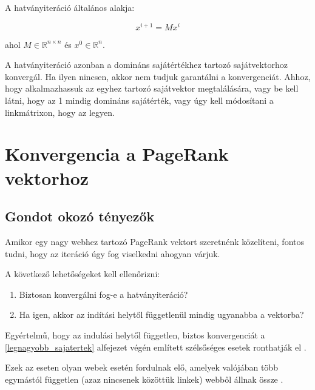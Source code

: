 \documentclass[12pt,a4paper]{article}
\begin{document}
\vspace{0.2cm}
A hatványiteráció általános alakja:

\[ x^{i+1} = M x^i \]

ahol $M \in \mathbb{R}^{n \times n}$ és $x^0 \in \mathbb{R}^n$.
\vspace{0.2cm}

A hatványiteráció azonban a domináns sajátértékhez tartozó sajátvektorhoz konvergál. Ha ilyen nincsen, akkor nem tudjuk garantálni a konvergenciát. Ahhoz, hogy alkalmazhassuk az egyhez tartozó sajátvektor megtalálására, vagy be kell látni, hogy az 1 mindig domináns sajátérték, vagy úgy kell módosítani a linkmátrixon, hogy az legyen.

\section{Konvergencia a PageRank vektorhoz}

\subsection{Gondot okozó tényezők}

Amikor egy nagy webhez tartozó PageRank vektort szeretnénk közelíteni, fontos tudni, hogy az iteráció úgy fog viselkedni ahogyan várjuk.

\vspace{0.3cm}
A következő lehetőségeket kell ellenőrizni:

\begin{enumerate}
	\item Biztosan konvergálni fog-e a hatványiteráció?
	\item Ha igen, akkor az indítási helytől függetlenül mindig ugyanabba a vektorba? 
\end{enumerate}

Egyértelmű, hogy az indulási helytől független, biztos konvergenciát a \ref{legnagyobb_sajatertek} alfejezet végén említett szélsőséges esetek ronthatják el \cite{kleinproject}.

Ezek az eseten olyan webek esetén fordulnak elő, amelyek valójában több egymástól független (azaz nincsenek közöttük linkek) webből állnak össze \cite{kurt}.
\end{document}
